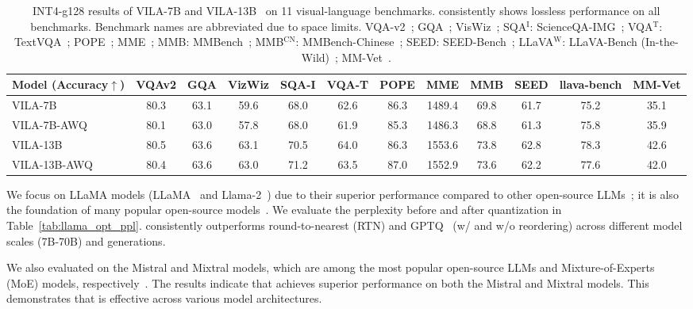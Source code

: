 \begin{table*}
    \setlength{\tabcolsep}{5pt}
    \small
    \centering
\begin{tabular}{@{}lccccccccccc@{}}
\toprule
\textbf{Model (Accuracy$\uparrow$)} & VQAv2 & GQA & VizWiz & SQA-I & VQA-T & POPE & MME & MMB & SEED & llava-bench & MM-Vet \\
\midrule
VILA-7B           & 80.3 & 63.1 & 59.6   & 68.0  & 62.6  & 86.3  & 1489.4 & 69.8	   & 61.7 & 75.2        & 35.1   \\
VILA-7B-AWQ       & 80.1 & 63.0 & 57.8   & 68.0  & 61.9  & 85.3  & 1486.3 & 68.8   & 61.3 & 75.8        & 35.9   \\
VILA-13B          & 80.5 & 63.6 & 63.1   & 70.5  & 64.0  & 86.3  & 1553.6 & 73.8   & 62.8 & 78.3        & 42.6   \\
VILA-13B-AWQ      & 80.4 & 63.6 & 63.0   & 71.2  & 63.5  & 87.0  & 1552.9 & 73.6   & 62.2 & 77.6        & 42.0   \\
\bottomrule
\end{tabular}
\caption{INT4-g128 results of VILA-7B and VILA-13B~\cite{lin2023vila} on 11 visual-language benchmarks. \methodshort consistently shows lossless performance on all benchmarks. Benchmark names are abbreviated due to space limits. VQA-v2~\cite{goyal2017vqav2}; GQA~\cite{hudson2019gqa}; VisWiz~\cite{gurari2018vizwiz}; SQA$^\text{I}$: ScienceQA-IMG~\cite{lu2022learn}; VQA$^\text{T}$: TextVQA~\cite{singh2019textvqa}; POPE~\cite{li2023pope}; MME~\cite{fu2023mme}; MMB: MMBench~\cite{liu2023mmbench}; MMB$^\text{CN}$: MMBench-Chinese~\cite{liu2023mmbench}; SEED: SEED-Bench~\cite{li2023seed}; LLaVA$^\text{W}$: LLaVA-Bench (In-the-Wild)~\cite{liu2023llava}; MM-Vet~\cite{yu2023mmvet}.}
\label{tab:vila_acc}

\end{table*}

We focus on LLaMA models (LLaMA~\cite{touvron2023llama} and Llama-2~\cite{touvron2023llama2}) due to their superior performance compared to other open-source LLMs~\cite{opt, scao2022bloom}; it is also the foundation of many popular open-source models~\cite{alpaca, vicuna2023}. We evaluate the perplexity before and after quantization in Table~\ref{tab:llama_opt_ppl}. 
\methodshort consistently outperforms round-to-nearest (RTN) and GPTQ~\cite{frantar2022gptq} (w/ and w/o reordering) across different model scales (7B-70B) and generations. 

We also evaluated \methodshort on the Mistral and Mixtral models, which are among the most popular open-source LLMs and Mixture-of-Experts (MoE) models, respectively~\cite{jiang2023mistral, jiang2024mixtral}. The results indicate that \methodshort achieves superior performance on both the Mistral and Mixtral models. This demonstrates that \methodshort is effective across various model architectures.

